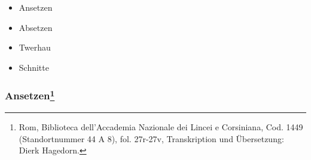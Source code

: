 \begin{itemize}
    \item Ansetzen
    \item Absetzen
    \item Twerhau
    \item Schnitte
\end{itemize}

\newpage

\null
\thispagestyle{empty}

\newpage

\subsubsection[Ansetzen]{
    Ansetzen\footnote{
        \hspace*{0.5ex}Rom, Biblioteca dell'Accademia Nazionale dei Lincei e Corsiniana,
        Cod. 1449 (Standortnummer 44 A 8), fol. 27r-27v, Transkription und Übersetzung: Dierk Hagedorn.}}

